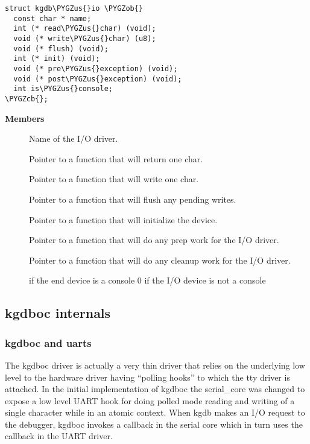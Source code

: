 \documentclass[a4paper,8pt,english]{sphinxmanual}
\def\PYGZus{\char`\_}
\def\PYGZob{\char`\{}
\def\PYGZcb{\char`\}}
\begin{document}
\begin{Verbatim}[commandchars=\\\{\}]
struct kgdb\PYGZus{}io \PYGZob{}
  const char * name;
  int (* read\PYGZus{}char) (void);
  void (* write\PYGZus{}char) (u8);
  void (* flush) (void);
  int (* init) (void);
  void (* pre\PYGZus{}exception) (void);
  void (* post\PYGZus{}exception) (void);
  int is\PYGZus{}console;
\PYGZcb{};
\end{Verbatim}

\textbf{Members}
\begin{description}
\item[{}] \leavevmode
Name of the I/O driver.

\item[{}] \leavevmode
Pointer to a function that will return one char.

\item[{}] \leavevmode
Pointer to a function that will write one char.

\item[{}] \leavevmode
Pointer to a function that will flush any pending writes.

\item[{}] \leavevmode
Pointer to a function that will initialize the device.

\item[{}] \leavevmode
Pointer to a function that will do any prep work for
the I/O driver.

\item[{}] \leavevmode
Pointer to a function that will do any cleanup work
for the I/O driver.

\item[{}]  if the end device is a console 0 if the I/O device is
not a console

\end{description}


\subsection{kgdboc internals}
\label{dev-tools/kgdb:kgdboc-internals}

\subsubsection{kgdboc and uarts}
\label{dev-tools/kgdb:kgdboc-and-uarts}
The kgdboc driver is actually a very thin driver that relies on the
underlying low level to the hardware driver having ``polling hooks'' to
which the tty driver is attached. In the initial implementation of
kgdboc the serial\_core was changed to expose a low level UART hook for
doing polled mode reading and writing of a single character while in an
atomic context. When kgdb makes an I/O request to the debugger, kgdboc
invokes a callback in the serial core which in turn uses the callback in
the UART driver.
\end{document}
